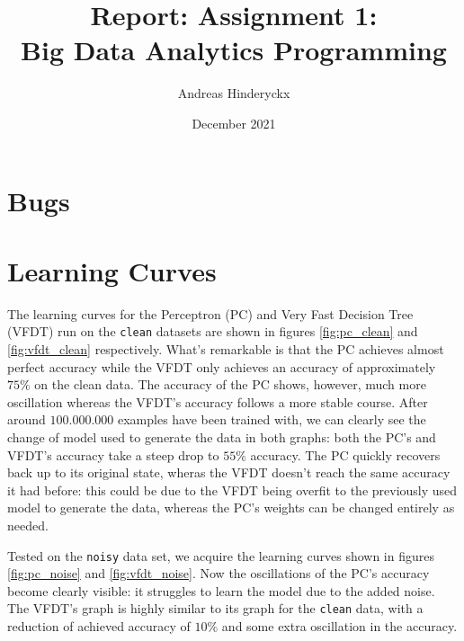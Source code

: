 \documentclass[12pt]{article}
\title{Report: Assignment 1: \\Big Data Analytics Programming}
\author{Andreas Hinderyckx}
\date{December 2021}
\begin{document}
\newcommand{\todo}{\fbox{\textbf{\textcolor{red}{TODO}}} }
\newcommand{\sctf}[1]{10\mathrm{e}{-#1}}
\maketitle

\newpage

\section{Bugs}\todo
\section{Learning Curves}
The learning curves for the Perceptron (PC) and Very Fast Decision Tree (VFDT) run on the \texttt{clean} datasets are shown in figures \ref{fig:pc_clean} and \ref{fig:vfdt_clean} respectively. What's remarkable is that the PC achieves almost perfect accuracy while the VFDT only achieves an accuracy of approximately $75\%$ on the clean data. The accuracy of the PC shows, however, much more oscillation whereas the VFDT's accuracy follows a more stable course. After around $100.000.000$ examples have been trained with, we can clearly see the change of model used to generate the data in both graphs: both the PC's and VFDT's accuracy take a steep drop to $55\%$ accuracy. The PC quickly recovers back up to its original state, wheras the VFDT doesn't reach the same accuracy it had before: this could be due to the VFDT being overfit to the previously used model to generate the data, whereas the PC's weights can be changed entirely as needed.	

Tested on the \texttt{noisy} data set, we acquire the learning curves shown in figures \ref{fig:pc_noise} and \ref{fig:vfdt_noise}. Now the oscillations of the PC's accuracy become clearly visible: it struggles to learn the model due to the added noise. The VFDT's graph is highly similar to its graph for the \texttt{clean} data, with a reduction of achieved accuracy of $10\%$ and some extra oscillation in the accuracy.
\end{document}
